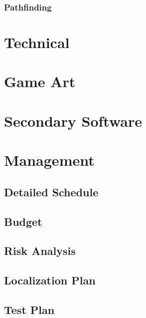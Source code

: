 \documentclass[12pt,titlepage]{article}
\begin{document}
\subsubsection{Pathfinding}

\section{Technical}
%

\section{Game Art}
%

\section{Secondary Software}

\section{Management}

\subsection{Detailed Schedule}

\subsection{Budget}

\subsection{Risk Analysis}

\subsection{Localization Plan}

\subsection{Test Plan}
\end{document}
